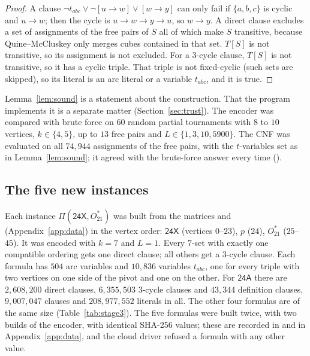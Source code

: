 \documentclass[11pt]{amsart}
\theoremstyle{definition}
\theoremstyle{remark}
\newcommand{\Ostar}{O_{21}^{*}}
\newcommand{\cl}[1]{\textsf{#1}}
\newcommand{\Piv}[2]{\Pi(#1,#2)}
\begin{document}
\begin{proof}
A clause $\neg t_{abc} \vee \neg[u\to w] \vee [w\to y]$ can only fail if
$\{a,b,c\}$ is cyclic and $u \to w$; then the cycle is $u \to w \to y \to u$, so
$w \to y$. A direct clause excludes a set of assignments of the free pairs of
$S$ all of which make $S$ transitive, because Quine--McCluskey only merges
cubes contained in that set. $T[S]$ is not transitive, so its assignment is
not excluded. For a $3$-cycle clause, $T[S]$ is not transitive, so it has a
cyclic triple. That triple is not fixed-cyclic (such sets are skipped), so its
literal is an arc literal or a variable $t_{abc}$, and it is true.
\end{proof}

Lemma~\ref{lem:sound} is a statement about the construction. That the program
implements it is a separate matter (Section~\ref{sec:trust}). The encoder was
compared with brute force on $60$ random partial tournaments with $8$ to $10$
vertices, $k\in\{4,5\}$, up to $13$ free pairs and $L \in \{1,3,10,5900\}$.
The CNF was evaluated on all $74{,}944$ assignments of the free pairs, with the
$t$-variables set as in Lemma~\ref{lem:sound}; it agreed with the brute-force
answer every time ().

\subsection{The five new instances}\label{sec:stage3enc}
Each instance $\Piv{\cl{24X}}{\Ostar}$ was built from the matrices
 and  (Appendix~\ref{app:data})
in the vertex order: $\cl{24X}$ (vertices $0$--$23$), $p$ ($24$), $\Ostar$
($25$--$45$). It was
encoded with $k=7$ and $L=1$. Every $7$-set with exactly one compatible
ordering gets one direct clause; all others get a $3$-cycle clause. Each
formula has $504$ arc variables and $10{,}836$ variables $t_{abc}$, one for
every triple with two vertices on one side of the pivot and one on the other.
For $\cl{24A}$ there are $2{,}608{,}200$ direct clauses, $6{,}355{,}503$
$3$-cycle clauses and $43{,}344$ definition clauses, $9{,}007{,}047$ clauses and
$208{,}977{,}552$ literals in all. The other four formulas are of the same size
(Table~\ref{tab:stage3}). The five formulas were built twice, with two builds
of the encoder, with identical SHA-256 values; these are recorded in
 and in Appendix~\ref{app:data}, and the cloud
driver refused a formula with any other value.
\end{document}
